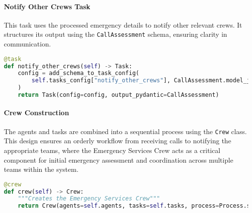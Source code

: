 \paragraph{Notify Other Crews Task}
This task uses the processed emergency details to notify other relevant crews. It structures its output using the \texttt{CallAssessment} schema, ensuring clarity in communication.

\begin{lstlisting}[language=Python]
@task
def notify_other_crews(self) -> Task:
    config = add_schema_to_task_config(
        self.tasks_config["notify_other_crews"], CallAssessment.model_json_schema()
    )
    return Task(config=config, output_pydantic=CallAssessment)
\end{lstlisting}

\paragraph{Crew Construction}
The agents and tasks are combined into a sequential process using the \texttt{Crew} class. This design ensures an orderly workflow from receiving calls to notifying the appropriate teams, where the Emergency Services Crew acts as a critical component for initial emergency assessment and coordination across multiple teams within the system.

\begin{lstlisting}[language=Python]
@crew
def crew(self) -> Crew:
    """Creates the Emergency Services Crew"""
    return Crew(agents=self.agents, tasks=self.tasks, process=Process.sequential)
\end{lstlisting}

